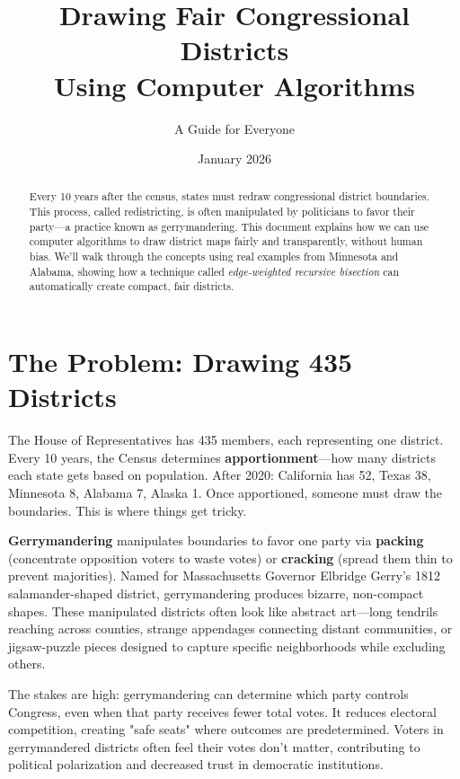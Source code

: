 \documentclass[11pt]{article}
\title{\textbf{Drawing Fair Congressional Districts\\Using Computer Algorithms}}
\author{A Guide for Everyone}
\date{January 2026}
\begin{document}
\maketitle

\begin{abstract}
Every 10 years after the census, states must redraw congressional district boundaries. This process, called redistricting, is often manipulated by politicians to favor their party—a practice known as gerrymandering. This document explains how we can use computer algorithms to draw district maps fairly and transparently, without human bias. We'll walk through the concepts using real examples from Minnesota and Alabama, showing how a technique called \textit{edge-weighted recursive bisection} can automatically create compact, fair districts.
\end{abstract}

\tableofcontents

\section{The Problem: Drawing 435 Districts}

The House of Representatives has 435 members, each representing one district. Every 10 years, the Census determines \textbf{apportionment}—how many districts each state gets based on population. After 2020: California has 52, Texas 38, Minnesota 8, Alabama 7, Alaska 1. Once apportioned, someone must draw the boundaries. This is where things get tricky.

\textbf{Gerrymandering} manipulates boundaries to favor one party via \textbf{packing} (concentrate opposition voters to waste votes) or \textbf{cracking} (spread them thin to prevent majorities). Named for Massachusetts Governor Elbridge Gerry's 1812 salamander-shaped district, gerrymandering produces bizarre, non-compact shapes. These manipulated districts often look like abstract art—long tendrils reaching across counties, strange appendages connecting distant communities, or jigsaw-puzzle pieces designed to capture specific neighborhoods while excluding others.

The stakes are high: gerrymandering can determine which party controls Congress, even when that party receives fewer total votes. It reduces electoral competition, creating "safe seats" where outcomes are predetermined. Voters in gerrymandered districts often feel their votes don't matter, contributing to political polarization and decreased trust in democratic institutions.
\end{document}
